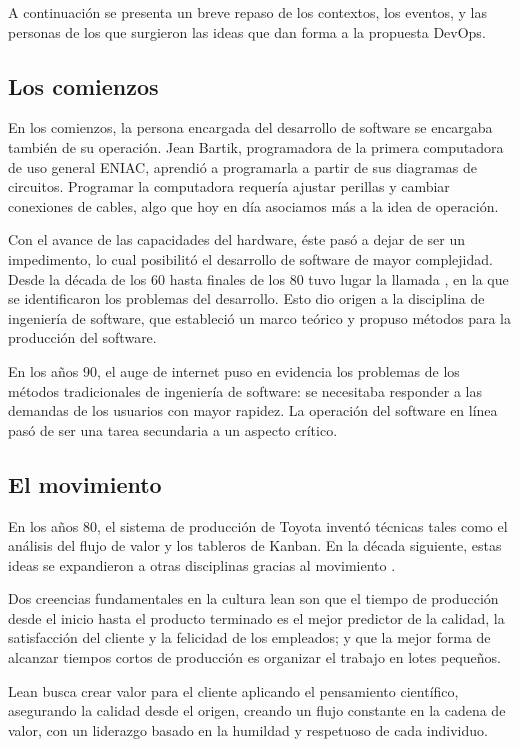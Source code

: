 A continuación se presenta un breve repaso de los contextos, los
eventos, y las personas de los que surgieron las ideas que dan forma a
la propuesta DevOps.

\subsection{Los comienzos}

En los comienzos, la persona encargada del desarrollo de software se
encargaba también de su operación. Jean Bartik, programadora de la
primera computadora de uso general ENIAC, aprendió a programarla a
partir de sus diagramas de circuitos. Programar la computadora
requería ajustar perillas y cambiar conexiones de cables, algo que hoy
en día asociamos más a la idea de operación.

Con el avance de las capacidades del hardware, éste pasó a dejar de
ser un impedimento, lo cual posibilitó el desarrollo de software de
mayor complejidad. Desde la década de los 60 hasta finales de los 80
tuvo lugar la llamada , en la que se
identificaron los problemas del desarrollo. Esto dio origen a la
disciplina de ingeniería de software, que estableció un marco teórico
y propuso métodos para la producción del software.

En los años 90, el auge de internet puso en evidencia los problemas de
los métodos tradicionales de ingeniería de software: se necesitaba
responder a las demandas de los usuarios con mayor rapidez. La
operación del software en línea pasó de ser una tarea secundaria a un
aspecto crítico.

\subsection{El movimiento }

En los años 80, el sistema de producción de Toyota inventó técnicas
tales como el análisis del flujo de valor y los tableros de Kanban. En
la década siguiente, estas ideas se expandieron a otras disciplinas
gracias al movimiento .

Dos creencias fundamentales en la cultura lean son que el tiempo de
producción desde el inicio hasta el producto terminado es el mejor
predictor de la calidad, la satisfacción del cliente y la felicidad de
los empleados; y que la mejor forma de alcanzar tiempos cortos de
producción es organizar el trabajo en lotes pequeños.

Lean busca crear valor para el cliente aplicando el pensamiento
científico, asegurando la calidad desde el origen, creando un flujo
constante en la cadena de valor, con un liderazgo basado en la
humildad y respetuoso de cada individuo.


